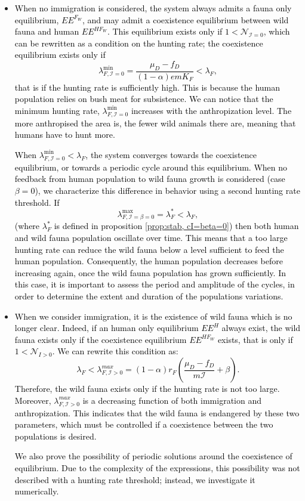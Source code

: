 \documentclass{article}
\newcommand{\lfw}{\lambda_{F}}
\newcommand{\lfw}{\lambda_{F}}
\newcommand{\cI}{\mathcal{I}}
\newcommand{\N}{\mathcal{N}}
\newcommand{\vdeux}[1]{\textcolor{black}{#1}}
\theoremstyle{definition}
\theoremstyle{remark}
\begin{document}
\begin{itemize}
\item \vdeux{When no immigration is considered, the system always admits a fauna only equilibrium, $EE^{F_W}$, and may admit a coexistence equilibrium between wild fauna and human $EE^{HF_W}$. This equilibrium exists only if $1 < \N_{\cI = 0}$, which can be rewritten as a condition on the hunting rate; the coexistence equilibrium exists only if 
$$
\lambda_{F, \cI = 0}^{\min} = \dfrac{\mu_D - f_D}{(1-\alpha) e m K_F} < \lfw,
$$ that is if the hunting rate is sufficiently high. 
This is because the human population relies on bush meat for subsistence. We can notice that the minimum hunting rate, $\lambda_{F, \cI = 0}^{\min}$ increases with the anthropization level. The more anthropised the area is, the fewer wild animals there are, meaning that humans have to hunt more.
}

\vdeux{
When $\lambda_{F, \cI = 0}^{\min} < \lfw $, the system converges towards the coexistence equilibrium, or towards a periodic cycle around this equilibrium. When no feedback from human population to wild fauna growth is considered (case $\beta = 0$), we characterize this difference in behavior using a second hunting rate threshold. If 
$$
\lambda_{F, \cI=\beta=0}^{\max} = \lfw^* < \lfw,
$$ (where $\lfw^*$ is defined in proposition \ref{prop:stab, cI=beta=0}) then both human and wild fauna population oscillate over time. This means that a too large hunting rate can reduce the wild fauna below a level sufficient to feed the human population. Consequently, the human population decreases before increasing again, once the wild fauna population has grown sufficiently. In this case, it is important to assess the period and amplitude of the cycles, in order to determine the extent and duration of  the populations variations.
}

\item \vdeux{When we consider immigration, it is the existence of wild fauna which is no longer clear. Indeed, if an human only equilibrium $EE^{H}$ always exist, the wild fauna exists only if the coexistence equilibrium $EE^{HF_W}$ exists, that is only if $1 < \N_{I>0}$. We can rewrite this condition as:
$$
\lfw < \lambda_{F, \cI > 0}^{max} = (1-\alpha) r_F\left(\dfrac{\mu_D - f_D}{m \cI} + \beta \right).
$$
Therefore, the wild fauna exists only if the hunting rate is not too large. Moreover, $\lambda_{F, \cI > 0}^{max}$ is a decreasing function of both immigration and anthropization. This indicates that the wild fauna is endangered by these two parameters, which must be controlled if a coexistence between the two populations is desired.
}

\vdeux{
We also prove the possibility of periodic solutions around the coexistence of equilibrium. Due to the complexity of the expressions, this possibility was not described with a hunting rate threshold; instead, we investigate it numerically.
}
\end{itemize}
\end{document}
